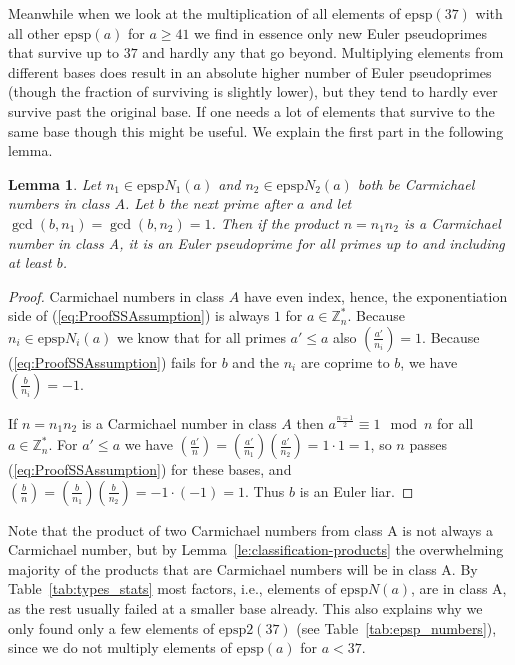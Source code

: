 \documentclass[runningheads]{amsart}
\newtheorem{lemma}[theorem]{Lemma}
\newcommand{\epsp}{\mathrm{epsp}}
\newcommand{\Z}{\mathbb{Z}}
\begin{document}
Meanwhile when we look at the multiplication of all elements of
$\epsp(37)$
with all other
$\epsp(a)$
for $a
\geq
41$ we find in essence only new Euler pseudoprimes that survive up to $37$ and hardly
any that go beyond.
Multiplying elements from different bases does result in an absolute higher number
of Euler pseudoprimes (though the fraction of surviving is slightly lower),
but they tend to hardly ever survive past the original base.
If one needs a lot of elements that survive to the same base though this might be
useful.
We explain the first part in the following lemma.

\begin{lemma}\label{le:one-more}
Let
$n_1\in
\epsp
N_1(a)$
and
$n_2
\in
\epsp
N_2(a)$
both be Carmichael numbers in class $A$.
Let $b$ the next prime after $a$ and let
$\gcd(b,n_1)
=\gcd(b,n_2)=1$.
Then if the product $n =
n_1n_2$
is a Carmichael number in class A,
it is an Euler pseudoprime for all primes up to and including at least $b$.
\end{lemma}

\begin{proof}
Carmichael numbers in class $A$ have even index,
hence,
the exponentiation side of
(\ref{eq:ProofSSAssumption})
is always $1$ for
$a\in
\Z_n^*$.
Because
$n_i
\in
\epsp
N_i(a)$
we know that for all primes
$a'\le
a$ also
$\left(\frac{a'}{n_i}\right)
= 1$.
Because
 (\ref{eq:ProofSSAssumption})
fails for $b$ and the
$n_i$
are coprime to $b$,
we have
$\left(\frac{b}{n_i}\right)
= -1$.

If $n =
n_1n_2$
is a Carmichael number in class $A$ then
$a^{\frac{n-1}{2}}
\equiv
1
\mod
n$ for all
$a\in
\Z_n^*$.
For $a'
\leq
a$ we have
$\left(\frac{a'}{n}\right)
=
\left(\frac{a'}{n_1}\right)
\left(\frac{a'}{n_2}\right)
= 1
\cdot
1 =
 1$,
so $n$ passes
 (\ref{eq:ProofSSAssumption})
for these bases,
and
$\left(\frac{b}{n}\right)
=
\left(\frac{b}{n_1}\right)
\left(\frac{b}{n_2}\right)
= -1
\cdot
(-1) =
 1$.
Thus $b$ is an Euler liar.
\end{proof}

Note that the product of two Carmichael numbers from class A is not always a Carmichael
number,
but by
 Lemma~\ref{le:classification-products}
the overwhelming majority of the products that are Carmichael numbers will be in class
A.
By
Table~\ref{tab:types_stats}
most factors,
i.e.,
elements of
$\epsp
N(a)$,
are in class A,
as the rest usually failed at a smaller base already.
This also explains why we only found only a few elements of
$\epsp2(37)$
(see
Table~\ref{tab:epsp_numbers}),
since we do not multiply elements of
$\epsp(a)$
for $a
<
37$.
\end{document}
